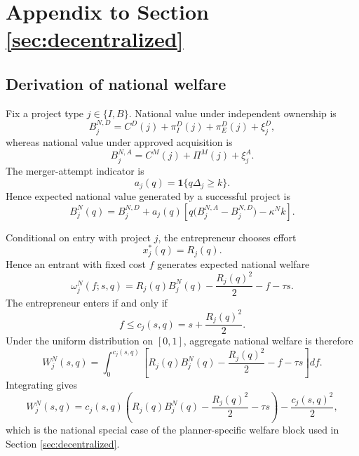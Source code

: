 \section{Appendix to Section \ref{sec:decentralized}}\label{app:decentralized}

\subsection{Derivation of national welfare}\label{app:nationalwelfare}

Fix a project type \(j \in \{I,B\}\).
National value under independent ownership is
\begin{equation}
    B_j^{N,D}
    =
    C^D(j)
    + \pi_I^D(j)
    + \pi_E^D(j)
    + \xi_j^D,
\end{equation}
whereas national value under approved acquisition is
\begin{equation}
    B_j^{N,A}
    =
    C^M(j)
    + \Pi^M(j)
    + \xi_j^A.
\end{equation}
The merger-attempt indicator is
\begin{equation}
    a_j(q)=\mathbf{1}\{q\Delta_j \ge k\}.
\end{equation}
Hence expected national value generated by a successful project is
\begin{equation}
    B_j^N(q)
    =
    B_j^{N,D}
    +
    a_j(q)
    \left[
        q\bigl(B_j^{N,A}-B_j^{N,D}\bigr)
        -
        \kappa^N k
    \right].
\end{equation}

Conditional on entry with project \(j\), the entrepreneur chooses effort
\begin{equation}
    x_j^*(q)=R_j(q).
\end{equation}
Hence an entrant with fixed cost \(f\) generates expected national welfare
\begin{equation}
    \omega_j^N(f;s,q)
    =
    R_j(q)B_j^N(q)
    -
    \frac{R_j(q)^2}{2}
    -
    f
    -
    \tau s.
\end{equation}
The entrepreneur enters if and only if
\begin{equation}
    f \le c_j(s,q)=s+\frac{R_j(q)^2}{2}.
\end{equation}
Under the uniform distribution on \([0,1]\), aggregate national welfare is therefore
\begin{equation}
    W_j^N(s,q)
    =
    \int_0^{c_j(s,q)}
    \left[
        R_j(q)B_j^N(q)
        -
        \frac{R_j(q)^2}{2}
        -
        f
        -
        \tau s
    \right] df.
\end{equation}
Integrating gives
\begin{equation}
    W_j^N(s,q)
    =
    c_j(s,q)
    \left(
        R_j(q)B_j^N(q)
        -
        \frac{R_j(q)^2}{2}
        -
        \tau s
    \right)
    -
    \frac{c_j(s,q)^2}{2},
\end{equation}
which is the national special case of the planner-specific welfare block used in Section \ref{sec:decentralized}.

